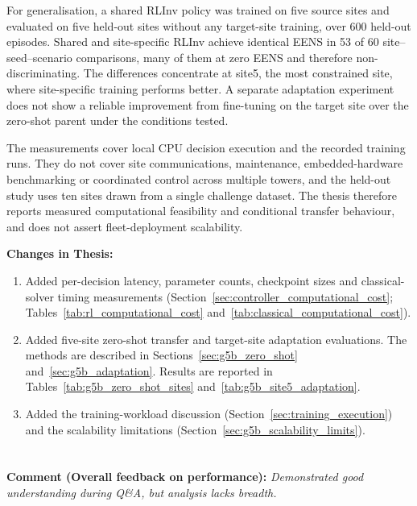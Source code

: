 For generalisation, a shared RLInv policy was trained on five source sites and
evaluated on five held-out sites without any target-site training, over 600
held-out episodes. Shared and site-specific RLInv achieve identical EENS in 53
of 60 site--seed--scenario comparisons, many of them at zero EENS and therefore
non-discriminating. The differences concentrate at site5, the most constrained
site, where site-specific training performs better. A separate adaptation
experiment does not show a reliable improvement from fine-tuning on the target
site over the zero-shot parent under the conditions tested.

The measurements cover local CPU decision execution and the recorded training
runs. They do not cover site communications, maintenance, embedded-hardware
benchmarking or coordinated control across multiple towers, and the held-out
study uses ten sites drawn from a single challenge dataset. The thesis
therefore reports measured computational feasibility and conditional transfer
behaviour, and does not assert fleet-deployment scalability.

\vspace{\baselineskip}

\noindent\textbf{Changes in Thesis:}
\begin{enumerate}
  \item Added per-decision latency, parameter counts, checkpoint sizes and
        classical-solver timing measurements
        (Section~\ref{sec:controller_computational_cost};
        Tables~\ref{tab:rl_computational_cost}
        and~\ref{tab:classical_computational_cost}).
  \item Added five-site zero-shot transfer and
      target-site adaptation evaluations.
      The methods are described in
      Sections~\ref{sec:g5b_zero_shot}
      and~\ref{sec:g5b_adaptation}.
      Results are reported in
      Tables~\ref{tab:g5b_zero_shot_sites}
      and~\ref{tab:g5b_site5_adaptation}.
  \item Added the training-workload discussion
        (Section~\ref{sec:training_execution}) and the scalability limitations
        (Section~\ref{sec:g5b_scalability_limits}).
\end{enumerate}


\section{}
\label{sec:rebuttal_breadth}

\noindent\textbf{Comment (Overall feedback on performance):} \textit{Demonstrated
good understanding during Q\&A, but analysis lacks breadth.}


